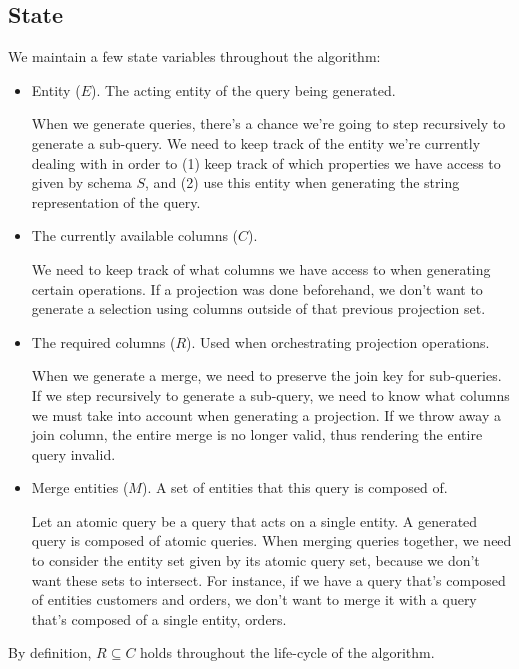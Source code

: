 \documentclass[10pt, twocolumn]{article}
\begin{document}
\subsection*{State}

We maintain a few state variables throughout the algorithm:

\begin{itemize}
  \item Entity ($E$). The acting entity of the query being generated.

  \spacing
  When we generate queries, there's a chance we're going to step recursively to generate a sub-query.
  We need to keep track of the entity we're currently dealing with in order to (1) keep track of which properties we have access
  to given by schema $S$, and (2) use this entity when generating the string representation of the query.
  \spacing

  \item The currently available columns ($C$).

  \spacing
  We need to keep track of what columns we have access to when generating certain operations. If a projection was done beforehand, we don't want to generate a selection using columns outside of that previous projection set.
  \spacing

  \item The required columns ($R$). Used when orchestrating projection operations.

  \spacing
  When we generate a merge, we need to preserve the join key for sub-queries. If we step recursively to generate a sub-query, we
  need to know what columns we must take into account when generating a projection. If we throw away a join column, the entire merge is no longer valid, thus rendering the entire query invalid.
  \spacing

  \item Merge entities ($M$). A set of entities that this query is composed of.

  \spacing
  Let an atomic query be a query that acts on a single entity. A generated query is composed of atomic queries. When merging queries together, we need to consider the entity set given by its atomic query set, because we don't want these sets to intersect. For instance, if we have a query that's composed of entities customers and orders, we don't want to merge it with a query that's composed of a single entity, orders.
\end{itemize}

\noindent
By definition, $R \subseteq C$ holds throughout the life-cycle of the algorithm.
\end{document}
